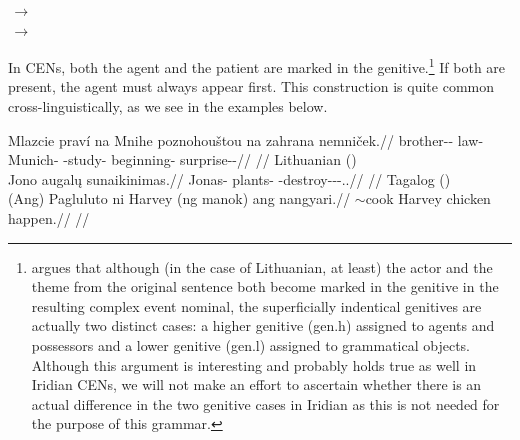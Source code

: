 \begin{multicols}{2}
\pex
    \a {}\,$\rightarrow$\,\\
    \a {}\,$\rightarrow$\,\\
\xe
\end{multicols}

In CENs, both the agent and the patient are marked in the genitive.\footnote{\textcite{serekaite2020} argues that although (in the case of Lithuanian, at least) the actor and the theme from the original sentence both become marked in the genitive in the resulting complex event nominal, the superficially indentical genitives are actually two distinct cases: a higher genitive ({\sc gen.h}) assigned to agents and possessors and a lower genitive ({\sc gen.l}) assigned to grammatical objects. Although this argument is interesting and probably holds true as well in Iridian CENs, we will not make an effort to ascertain whether there is an actual difference in the two genitive cases in Iridian as this is not needed for the purpose of this grammar.} If both are present, the agent must always appear first. This construction is quite common cross-linguistically, as we see in the examples below.

\pex
\a\begingl
    \gla Mlazcie praví na Mnihe poznohouštou na zahrana nemniček.//
    \glb brother-\Dim{}-\Gen{} law-\Gen{} \Loc{} Munich-\Acc{} \Ger{}-study-\Nz{} \Loc{} beginning-\Acc{} surprise-\Av{}-\Pf{}//
    \glft {}//
\endgl
\a Lithuanian (\cite[1]{serekaite2020})\\
\begingl
    \gla Jono augal\k{u} sunaikinimas.//
    \glb Jonas-\Gen{} plants-\Gen{} \Pfv{}-destroy-\Caus{}-\Nz-\Nom{}.\M{}.\Sg{}//
    \glft {}//
\endgl
\a Tagalog (\cite[22]{hsieh2019})\\
\begingl
    \gla (Ang) Pagluluto ni Harvey (ng manok) ang nangyari.//
    \glb \Nom{} \Ger{}$\sim$cook \Gen{} Harvey \Gen{} chicken \Nom{} happen.\Pfv{}//
    \glft {}//
\endgl
\xe


